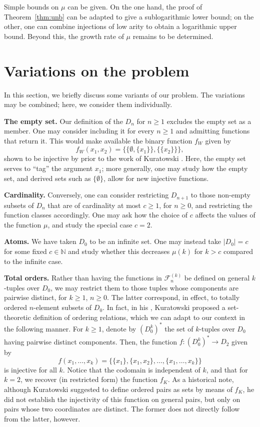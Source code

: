 \documentclass[a4paper,12pt]{article}
\theoremstyle{definition}
\theoremstyle{remark}
\newcommand{\fset}[2]{\mathcal F^{(#1)}_{#2}}
\newcommand{\N}{\mathbb N}
\begin{document}
Simple bounds on $\mu$ can be given. On the one hand, the proof of Theorem~\ref{thm:unb} can be adapted to give a sublogarithmic lower bound; on the other, one can combine injections of low arity to obtain a logarithmic upper bound. Beyond this, the growth rate of $\mu$ remains to be determined.

\section{Variations on the problem}\label{sec:var}

In this section, we briefly discuss some variants of our problem. The variations may be combined; here, we consider them individually.

\textbf{The empty set.} Our definition of the $D_n$ for $n \geq 1$ excludes the empty set as a member. One may consider including it for every $n \geq 1$ and admitting functions that return it. This would make available the binary function $f_W$ given by
\[f_W(x_1, x_2) = \{\{\emptyset, \{x_1\}\}, \{\{x_2\}\}\},\]
shown to be injective by \textcite{Wie} prior to the work of Kuratowski \parencite[see][290]{Kan}. Here, the empty set serves to ``tag'' the argument $x_1$; more generally, one may study how the empty set, and derived sets such as $\{\emptyset\}$, allow for new injective functions.

\textbf{Cardinality.} Conversely, one can consider restricting $D_{n+1}$ to those non-empty subsets of $D_n$ that are of cardinality at most $c \geq 1$, for $n \geq 0$, and restricting the function classes accordingly. One may ask how the choice of $c$ affects the values of the function $\mu$, and study the special case $c = 2$.

\textbf{Atoms.} We have taken $D_0$ to be an infinite set. One may instead take $|D_0| = c$ for some fixed $c \in \N$ and study whether this decreases $\mu(k)$ for $k > c$ compared to the infinite case.

\textbf{Total orders.} Rather than having the functions in $\fset kn$ be defined on general $k$-tuples over $D_0$, we may restrict them to those tuples whose components are pairwise distinct, for $k \geq 1$, $n \geq 0$. The latter correspond, in effect, to totally ordered $n$-element subsets of $D_0$. In fact, in his \parencite*{Kur}, Kuratowski proposed a set-theoretic definition of ordering relations, which we can adapt to our context in the following manner. For $k \geq 1$, denote by $(D_0^k)^*$ the set of $k$-tuples over $D_0$ having pairwise distinct components. Then, the function $f : (D_0^k)^* \to D_2$ given by
\[f(x_1, \dots, x_k) = \{\{x_1\}, \{x_1, x_2\}, \dots, \{x_1, \dots, x_k\}\}\]
is injective for all $k$. Notice that the codomain is independent of $k$, and that for $k = 2$, we recover (in restricted form) the function $f_K$. As a historical note, although Kuratowski suggested to define ordered pairs as sets by means of $f_K$, he did not establish the injectivity of this function on general pairs, but only on pairs whose two coordinates are distinct. The former does not directly follow from the latter, however.
\end{document}

